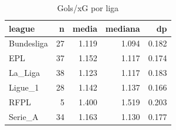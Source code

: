 \begin{table}

\caption{\label{tab:gols_xg_liga_g20}Gols/xG por liga}
\centering
\begin{tabular}[t]{lrrrr}
\toprule
league & n & media & mediana & dp\\
\midrule
Bundesliga & 27 & 1.119 & 1.094 & 0.182\\
EPL & 37 & 1.152 & 1.117 & 0.174\\
La\_Liga & 38 & 1.123 & 1.117 & 0.183\\
Ligue\_1 & 28 & 1.142 & 1.137 & 0.166\\
RFPL & 5 & 1.400 & 1.519 & 0.203\\
\addlinespace
Serie\_A & 34 & 1.163 & 1.130 & 0.177\\
\bottomrule
\end{tabular}
\end{table}
